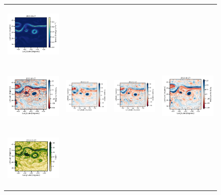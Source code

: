 \begin{figure}[H]
\begin{center}
{\begin{tabular}{cccc}
\includegraphics[width=4.0cm,height=3cm]{00_Oceanbench/content/figures/maps/ke/dc20a/nadir4/dc20a_4dvarnet_ke.png}  \\
\vspace{-2mm}
\includegraphics[trim={0 0 42mm 0},clip, width=3.20cm,height=3cm]{00_Oceanbench/content/figures/maps/rvort/dc20a/nadir4/dc20a_nemo_vort_r.png} &
\includegraphics[trim={0 0 42mm 0},clip, width=3.2cm,height=3cm]{00_Oceanbench/content/figures/maps/rvort/dc20a/nadir4/dc20a_miost_vort_r.png} &
\includegraphics[trim={0 0 42mm 0},clip, width=3.2cm,height=3cm]{00_Oceanbench/content/figures/maps/rvort/dc20a/nadir4/dc20a_bfnqg_vort_r.png} &
\includegraphics[width=4.0cm,height=3cm]{00_Oceanbench/content/figures/maps/rvort/dc20a/nadir4/dc20a_4dvarnet_vort_r.png}  \\
\includegraphics[trim={0 0 38mm 0},clip, width=3.20cm,height=3cm]{00_Oceanbench/content/figures/maps/strain/dc20a/nadir4/dc20a_nemo_strain.png} &

\end{tabular}}
\end{center}
\end{figure}
